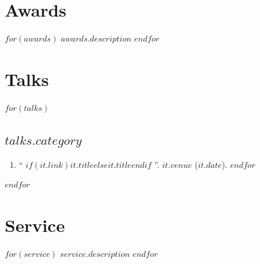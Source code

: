 \documentclass[11pt]{article}
\begin{document}
\section{Awards}
$for(awards)$
$awards.description$
$endfor$

\section{Talks}
$for(talks)$
\subsection{$talks.category$}
\begin{enumerate}
$for(talks.entries)$
\item ``%
	$if(it.link)$\href{$it.link$}{$it.title$}$else$$it.title$$endif$%
	''. $it.venue$ ($it.date$).
$endfor$
\end{enumerate}
$endfor$

\section{Service}
$for(service)$
$service.description$
$endfor$
\end{document}
